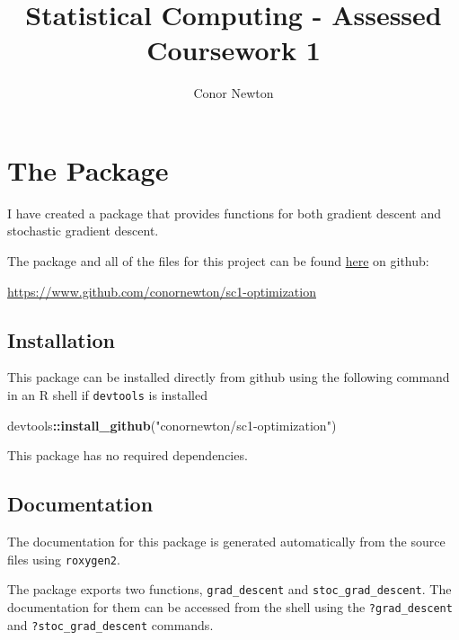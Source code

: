 \documentclass[12pt,]{article}
\title{Statistical Computing - Assessed Coursework 1}
\author{Conor Newton}
\date{}
\newenvironment{Shaded}{\begin{snugshade}}{\end{snugshade}}
\newcommand{\KeywordTok}[1]{\textcolor[rgb]{0.13,0.29,0.53}{\textbf{#1}}}
\newcommand{\NormalTok}[1]{#1}
\newcommand{\OperatorTok}[1]{\textcolor[rgb]{0.81,0.36,0.00}{\textbf{#1}}}
\newcommand{\StringTok}[1]{\textcolor[rgb]{0.31,0.60,0.02}{#1}}
\begin{document}
\maketitle

{
\setcounter{tocdepth}{3}
\tableofcontents
}
\newpage

\hypertarget{the-package}{%
\section{The Package}\label{the-package}}

I have created a package that provides functions for both gradient
descent and stochastic gradient descent.

The package and all of the files for this project can be found
\href{https://www.github.com/conornewton/sc1-optimization}{here} on
github:

\url{https://www.github.com/conornewton/sc1-optimization}

\hypertarget{installation}{%
\subsection{Installation}\label{installation}}

This package can be installed directly from github using the following
command in an R shell if \texttt{devtools} is installed

\begin{Shaded}
\begin{Highlighting}[]
\NormalTok{    devtools}\OperatorTok{::}\KeywordTok{install_github}\NormalTok{(}\StringTok{"conornewton/sc1-optimization"}\NormalTok{)}
\end{Highlighting}
\end{Shaded}

This package has no required dependencies.

\hypertarget{documentation}{%
\subsection{Documentation}\label{documentation}}

The documentation for this package is generated automatically from the
source files using \texttt{roxygen2}.

The package exports two functions, \texttt{grad\_descent} and
\texttt{stoc\_grad\_descent}. The documentation for them can be accessed
from the shell using the \texttt{?grad\_descent} and
\texttt{?stoc\_grad\_descent} commands.
\end{document}

